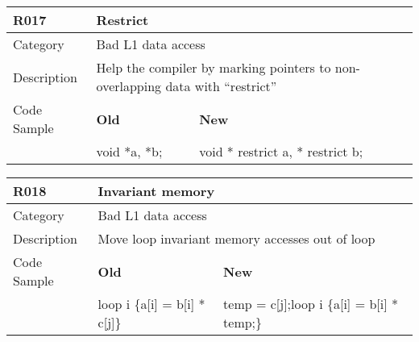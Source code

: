 \begin{tabular}{|p{0.9in}|p{2.0in}|p{2.0in}|} \hline
\textbf{R017}       & \multicolumn{2}{|p{4.0in}|}{\textbf{Restrict}} \\ \hline
Category            & \multicolumn{2}{|p{4.0in}|}{Bad L1 data access} \\ \hline
Description         & \multicolumn{2}{|p{4.0in}|}{Help the compiler by marking pointers to non-overlapping data with ``restrict''} \\ \hline
Code Sample         & \textbf{Old} & \textbf{New} \\ \hline
                    & void *a, *b; & void * restrict a, * restrict b; \\ \hline
\end{tabular}

\begin{tabular}{|p{0.9in}|p{2.0in}|p{2.0in}|} \hline
\textbf{R018}       & \multicolumn{2}{|p{4.0in}|}{\textbf{Invariant memory}} \\ \hline
Category            & \multicolumn{2}{|p{4.0in}|}{Bad L1 data access} \\ \hline
Description         & \multicolumn{2}{|p{4.0in}|}{Move loop invariant memory accesses out of loop} \\ \hline
Code Sample         & \textbf{Old} & \textbf{New} \\ \hline
                    & loop i \{\newline   a[i] = b[i] * c[j]\newline\}
                    & temp = c[j];\newline loop i \{\newline   a[i] = b[i] * temp;\newline \} \\ \hline
\end{tabular}

